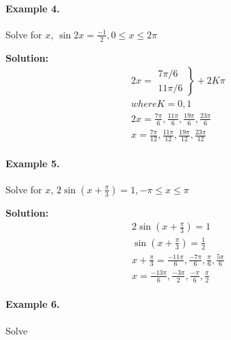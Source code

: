 \documentclass{article}
\begin{document}
\paragraph{Example 4.}
Solve for $x$, $\sin 2x = \frac{-1}{2}, 0 \leq x \leq 2\pi$

{\scriptsize \textbf{Solution:}}
\[
  \begin{aligned}
    2x =  \left. \begin{array}{c} 7\pi/6 \\ 11\pi/6 \end{array} \right\} + 2K\pi \\
    where K = 0, 1 \\
    2x = \frac{7\pi}{6}, \frac{11\pi}{6}, \frac{19\pi}{6}, \frac{23\pi}{6} \\
    x = \frac{7\pi}{12}, \frac{11\pi}{12}, \frac{19\pi}{12}, \frac{23\pi}{12}
  \end{aligned}
\]

\paragraph{Example 5.}
Solve for $x$, $2\sin\left( x + \frac{\pi}{3} \right) = 1, -\pi \leq x \leq \pi$

{\scriptsize \textbf{Solution:}}
\[
  \begin{aligned}
    2\sin\left( x + \frac{\pi}{3} \right) = 1 \\
    \sin\left( x + \frac{\pi}{3} \right) = \frac{1}{2} \\
    x + \frac{\pi}{3} = \frac{-11\pi}{6}, \frac{-7\pi}{6}, \frac{\pi}{6}, \frac{5\pi}{6} \\
    x = \frac{-13\pi}{6}, \frac{-3\pi}{2}, \frac{-\pi}{6}, \frac{\pi}{2}
  \end{aligned}
\]

\paragraph{Example 6.}
Solve
\end{document}
